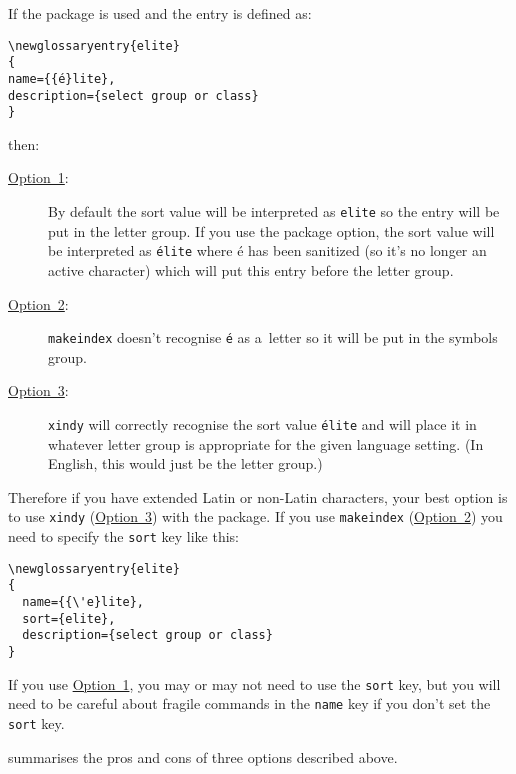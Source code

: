 \documentclass{nlctdoc}
\newcommand*{\opt}[1]{\hyperlink{option#1}{Option~#1}}
\begin{document}
If the  package is used and the entry is defined as:
\begin{alltt}
\verb|\newglossaryentry{elite}|
\verb|{|
  name=\verb|{{|\'e\verb|}lite},|
  description=\verb|{select group or class}|
\verb|}|
\end{alltt}
then:
\begin{description}
\item[\opt1:] By default the sort value will be interpreted as
\texttt{elite} so the entry will be put in the  letter group.
If you use the  package option, the
sort value will be interpreted as \texttt{\'elite} where \'e has
been sanitized (so it's no longer an active character) which will
put this entry before the  letter group.

\item[\opt2:] \texttt{makeindex} doesn't recognise \texttt{\'e} as
a~letter so it will be put in the symbols group.

\item[\opt3:] \texttt{xindy} will correctly recognise the sort value
\texttt{\'elite} and will place it in whatever letter group is
appropriate for the given language setting. (In English, this would
just be the  letter group.)
\end{description}

Therefore if you have extended Latin or non-Latin characters, your
best option is to use \texttt{xindy} (\opt3) with the 
package. If you use \texttt{makeindex} (\opt2) you need to specify the 
\texttt{sort} key like this:
\begin{verbatim}
\newglossaryentry{elite}
{
  name={{\'e}lite},
  sort={elite},
  description={select group or class}
}
\end{verbatim}
If you use \opt1, you may or may not need to use the \texttt{sort}
key, but you will need to be careful about fragile commands in the
\texttt{name} key if you don't set the \texttt{sort} key.

 summarises the pros and cons of three options described
above.
\end{document}

